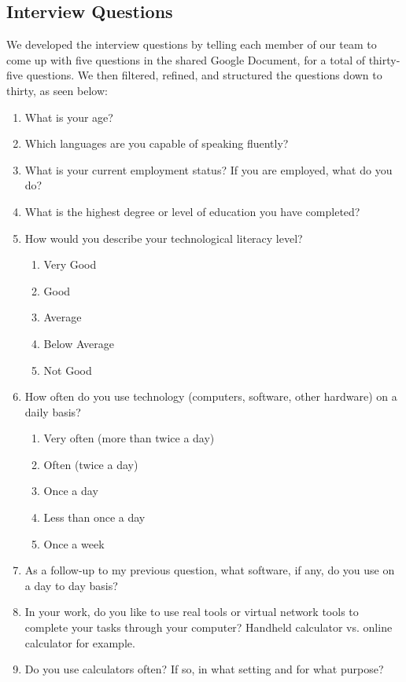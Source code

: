 \documentclass[11pt,onside]{report}
\begin{document}
\subsection{Interview Questions}
\begin{description}
We developed the interview questions by telling each member of our team to come up with five questions in the shared Google Document, for a total of thirty-five questions. We then filtered, refined, and structured the questions down to thirty, as seen below:
\end{description}
\begin{enumerate}
    \item What is your age?
    \item Which languages are you capable of speaking fluently?
    \item What is your current employment status? If you are employed, what do you do?
    \item What is the highest degree or level of education you have completed?
    \item How would you describe your technological literacy level?
    \begin{enumerate}
        \item Very Good
        \item Good
        \item Average
        \item Below Average
        \item Not Good
    \end{enumerate}
    \item How often do you use technology (computers, software, other hardware) on a daily basis?
    \begin{enumerate}
        \item Very often (more than twice a day)
        \item Often (twice a day)
        \item Once a day
        \item Less than once a day
        \item Once a week
    \end{enumerate}
    \item As a follow-up to my previous question, what software, if any, do you use on a day to day basis?
    \item In your work, do you like to use real tools or virtual network tools to complete your tasks through your computer? Handheld calculator vs. online calculator for example.
    \item Do you use calculators often? If so, in what setting and for what purpose?

\end{enumerate}
\end{document}
